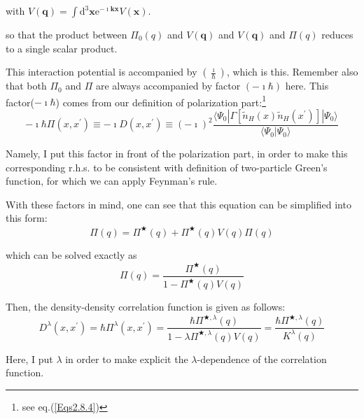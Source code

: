 with $V(\mathbf{q})=\int \mathrm{d}^3 \mathbf{x} \mathrm{e}^{-\imath \mathbf{k} \mathbf{x}} V(\mathbf{x})$.

so that the product between $\Pi_0(q)$ and $V(\mathbf{q})$ and $V(\mathbf{q})$ and $\Pi(q)$ reduces to a single scalar product.

This interaction potential is accompanied by $\left( \frac{\imath}{\hbar} \right)$, which is this. Remember also that both $\Pi_0$ and $\Pi$ are always accompanied by factor $(-\imath \hbar)$ here.
This factor($-\imath \hbar$) comes from our definition of polarization part:\footnote{see eq.(\ref{Eqs2.8.4})}
\[-\imath \hbar \Pi(x,x^{'})\equiv -\imath D(x,x^{'}) \equiv (-\imath)^2 \frac{\langle \Psi_0 | \Gamma[\tilde{n}_H(x)\tilde{n}_H(x^{'})]|\Psi_0\rangle}{\langle\Psi_0|\Psi_0\rangle}\]

Namely, I put this factor in front of the polarization part, in order to make this corresponding r.h.s. to be consistent with definition of two-particle Green's function, for which we can apply Feynman's rule.

With these factors in mind, one can see that this equation can be simplified into this form:
\begin{equation} \label{Eqs2.8.5}
\Pi(q) = \Pi^{\bigstar}(q)+\Pi^{\bigstar}(q) V(q) \Pi(q)
\end{equation}

which can be solved exactly as
\begin{equation*} \label{Eqs2.8.5'} \tag{2.8.5'} \Pi(q) = \frac{\Pi^{\bigstar}(q)}{1-\Pi^{\bigstar}(q) V(q)} \end{equation*}

Then, the density-density correlation function is given as follows:
\begin{equation} \label{Eqs2.8.6}
D^{\lambda}(x,x^{'}) = \hbar \Pi^{\lambda}(x,x^{'}) = \frac{\hbar \Pi^{\bigstar,\lambda}(q)}{1-\lambda\Pi^{\bigstar,\lambda}(q) V(q)} = \frac{\hbar \Pi^{\bigstar,\lambda}(q)}{K^{\lambda}(q)}
\end{equation}

Here, I put $\lambda$ in order to make explicit the $\lambda$-dependence of the correlation function.

